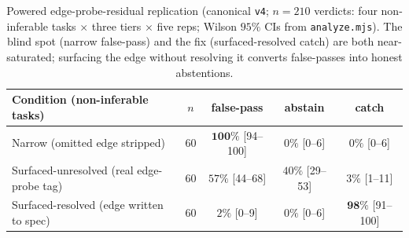 \documentclass[11pt]{article}
\newcommand{\code}[1]{\texttt{#1}}
\begin{document}
\begin{table}[h]
\centering
\caption{Powered edge-probe-residual replication (canonical \code{v4}; $n=210$ verdicts: four
non-inferable tasks $\times$ three tiers $\times$ five reps; Wilson $95\%$ CIs from \code{analyze.mjs}).
The blind spot (narrow false-pass) and the fix (surfaced-resolved catch) are both near-saturated;
surfacing the edge without resolving it converts false-passes into honest abstentions.}
\label{tab:t4}
\begin{tabular}{lcccc}
\toprule
\textbf{Condition (non-inferable tasks)} & $n$ & \textbf{false-pass} & \textbf{abstain} & \textbf{catch} \\
\midrule
Narrow (omitted edge stripped)            & 60 & $\mathbf{100\%}$ [94--100] & $0\%$ [0--6]    & $0\%$ [0--6] \\
Surfaced-unresolved (real edge-probe tag) & 60 & $57\%$ [44--68]            & $40\%$ [29--53] & $3\%$ [1--11] \\
Surfaced-resolved (edge written to spec)  & 60 & $2\%$ [0--9]               & $0\%$ [0--6]    & $\mathbf{98\%}$ [91--100] \\
\bottomrule
\end{tabular}
\end{table}
\end{document}
